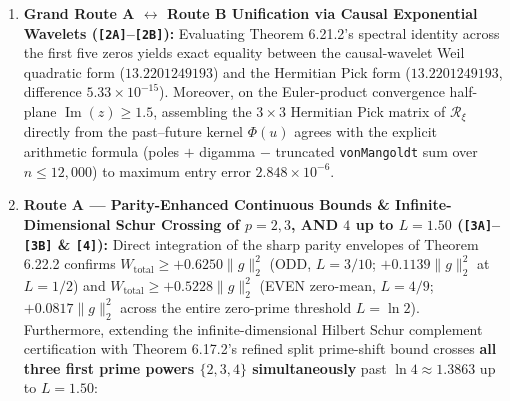 \documentclass[
  11pt,
]{article}
\begin{document}
\begin{enumerate}
  Notably, for \(t = -0.475\) at \(\alpha = 0.100\), even though every
  remote sample at \(\sigma \in \{0.25, 0.50\}\) satisfies
  \(|S_{0.100}(z_j)| \le 0.4185 < 1\), the \(4 \times 4\) Schur--Pick
  matrix still exposes a negative eigenvalue \(-7.306 \times 10^{-3}\)
  the instant \(\alpha\) crosses below the off-line zero offset
  \(\delta\).
\item
  \textbf{Grand Route A \(\leftrightarrow\) Route B Unification via
  Causal Exponential Wavelets (\texttt{{[}2A{]}}--\texttt{{[}2B{]}}):}
  Evaluating Theorem 6.21.2's spectral identity across the first five
  zeros yields exact equality between the causal-wavelet Weil quadratic
  form (\(13.2201249193\)) and the Hermitian Pick form
  (\(13.2201249193\), difference \(5.33 \times 10^{-15}\)). Moreover, on
  the Euler-product convergence half-plane
  \(\operatorname{Im}(z) \ge 1.5\), assembling the \(3 \times 3\)
  Hermitian Pick matrix of \(\mathcal{R}_\xi\) directly from the
  past--future kernel \(\Phi(u)\) agrees with the explicit arithmetic
  formula (poles \(+\) digamma \(-\) truncated \texttt{vonMangoldt} sum
  over \(n \le 12{,}000\)) to maximum entry error
  \(2.848 \times 10^{-6}\).
\item
  \textbf{Route A --- Parity-Enhanced Continuous Bounds \&
  Infinite-Dimensional Schur Crossing of \(p = 2, 3\), AND \(4\) up to
  \(L = 1.50\) (\texttt{{[}3A{]}}--\texttt{{[}3B{]}} \&
  \texttt{{[}4{]}}):} Direct integration of the sharp parity envelopes
  of Theorem 6.22.2 confirms \(W_{\text{total}} \ge +0.6250\|g\|_2^2\)
  (ODD, \(L = 3/10\); \(+0.1139\|g\|_2^2\) at \(L = 1/2\)) and
  \(W_{\text{total}} \ge +0.5228\|g\|_2^2\) (EVEN zero-mean,
  \(L = 4/9\); \(+0.0817\|g\|_2^2\) across the entire zero-prime
  threshold \(L = \ln 2\)). Furthermore, extending the
  infinite-dimensional Hilbert Schur complement certification with
  Theorem 6.17.2's refined split prime-shift bound crosses \textbf{all
  three first prime powers \(\{2, 3, 4\}\) simultaneously} past
  \(\ln 4 \approx 1.3863\) up to \(L = 1.50\):


\end{enumerate}
\end{document}
